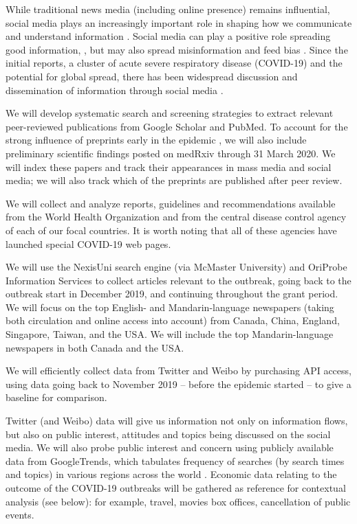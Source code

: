 While traditional news media (including online presence) remains influential,  social media plays an increasingly important role in shaping how we communicate and understand information \citep{LiuSieg19}. Social media can play a positive role spreading good information, \cite{BascHill20, SunYang20,AhmeQuin18}, but may also spread misinformation and feed bias \citep{ChouOhA18, McKevanS19}.
Since the initial reports, a cluster of acute severe respiratory disease (COVID-19) and the potential for global spread, there has been widespread discussion and dissemination of information through social media \citep{AhmBath19, ChewEyse10, TangBie18}.



 We will develop systematic search and screening strategies to extract relevant peer-reviewed publications from Google Scholar and PubMed. To account for the strong influence of preprints early in the epidemic \cite{MajuMandPRE}, we will also include preliminary scientific findings posted on medRxiv through 31 March 2020. We will index these papers and track their appearances in mass media and social media; we will also track which of the preprints are published after peer review.

 We will collect and analyze reports, guidelines and recommendations available from the World Health Organization and from the central disease control agency of each of our focal countries. It is worth noting that all of these agencies have launched special COVID-19 web pages.

 We will use the NexisUni search engine (via McMaster University) and OriProbe Information Services to collect articles relevant to the outbreak, going back to the outbreak start in December 2019, and continuing throughout the grant period. 
We will focus on the top English- and Mandarin-language newspapers (taking both circulation and online access into account) from 
Canada, China, England, Singapore, Taiwan, and the USA.
We will include the top Mandarin-language newspapers in both Canada and the USA.

We will efficiently collect data from Twitter and Weibo by purchasing API access, using data going back to November 2019 -- before the epidemic started -- to give a baseline for comparison. 

Twitter (and Weibo) data will give us information not only on information flows, but also on public interest, attitudes and topics being discussed on the social media. We will also probe public interest and concern using publicly available data from GoogleTrends, which tabulates frequency of searches (by search times and topics) in various regions across the world \cite{BousAgac17, MahrBrag19}.
Economic data relating to the outcome of the COVID-19 outbreaks will be gathered as reference for contextual analysis (see below): for example, travel, movies box offices, cancellation of public events.

